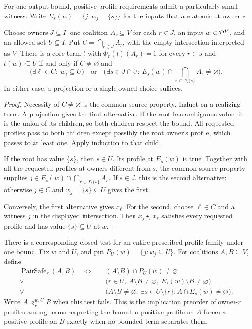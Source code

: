 For one output bound, positive profile requirements admit a particularly
small witness. Write $E_s(w)=\{j:w_j=\{s\}\}$ for the inputs that are
atomic at owner $s$.

\begin{theorem}\label{core:thm:one-bound-profiles}
Choose owners $J\subseteq I$, one coalition $A_r\subseteq V$ for each
$r\in J$, an input $w\in\mathcal P_+^V$, and an allowed set $U\subseteq I$.
Put $C=\bigcap_{r\in J}A_r$, with the empty intersection interpreted as
$V$. There is a core term $t$ with $\Phi_r(t)(A_r)=1$ for every $r\in J$
and $t(w)\subseteq U$ if and only if $C\ne\varnothing$ and
\[
 \bigl(\exists\ell\in C:\ w_\ell\subseteq U\bigr)
 \quad\text{or}\quad
 \biggl(\exists s\in J\cap U:\
 E_s(w)\cap\bigcap_{r\in J\setminus\{s\}}A_r\ne\varnothing\biggr).
\]
In either case, a projection or a single owned choice suffices.
\end{theorem}
\begin{proof}
Necessity of $C\ne\varnothing$ is the common-source property. Induct on
a realizing term. A projection gives the first alternative. If the root
has ambiguous value, it is the union of its children, so both children
respect the bound. All requested profiles pass to both children except
possibly the root owner's profile, which passes to at least one. Apply
induction to that child.

If the root has value $\{s\}$, then $s\in U$. Its profile at $E_s(w)$
is true. Together with all the requested profiles at owners different
from $s$, the common-source property supplies
$j\in E_s(w)\cap\bigcap_{r\in J\setminus\{s\}}A_r$.
If $s\in J$, this is the second alternative; otherwise $j\in C$ and
$w_j=\{s\}\subseteq U$ gives the first.

Conversely, the first alternative gives $x_\ell$. For the second, choose
$\ell\in C$ and a witness $j$ in the displayed intersection. Then
$x_j\star_s x_\ell$ satisfies every requested profile and has value
$\{s\}\subseteq U$ at $w$.
\end{proof}

There is a corresponding closed test for an entire prescribed profile
family under one bound. Fix $w$ and $U$, and put
$P_U(w)=\{j:w_j\subseteq U\}$. For coalitions $A,B\subseteq V$, define
\begin{equation}\label{core:eq:profile-pair-safe}
\begin{aligned}
 \operatorname{PairSafe}_r(A,B)\quad\Longleftrightarrow\quad
 & (A\setminus B)\cap P_U(w)\ne\varnothing\\
 {}\lor{}&\bigl(r\in U,\ A\setminus B\ne\varnothing,
                 \ E_r(w)\setminus B\ne\varnothing\bigr)\\
 {}\lor{}&\bigl(A\setminus B\ne\varnothing,\
       \exists s\in U\setminus\{r\}: A\cap E_s(w)\ne\varnothing\bigr).
\end{aligned}
\end{equation}
Write $A\preceq_r^{w,U}B$ when this test fails. This is the implication
preorder of owner-$r$ profiles among terms respecting the bound: a positive
profile on $A$ forces a positive profile on $B$ exactly when no bounded
term separates them.

